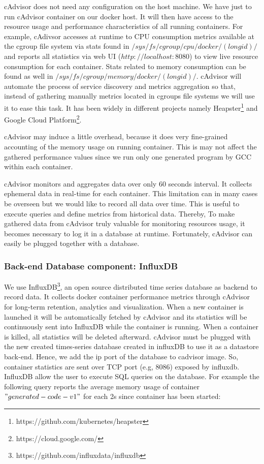 cAdvisor does not need any configuration on the host machine. We have just to run cAdvisor container on our docker host. It will then have access to the resource usage and performance characteristics of all running containers. For example, cAdivsor accesses at runtime to CPU consumption metrics available at the cgroup file system via stats found in $/sys/fs/cgroup/cpu/docker/(longid)/$ and reports all statistics via web UI ($http://localhost:8080$) to view live resource consumption for each container. Stats related to memory consumption can be found as well in $/sys/fs/cgroup/memory/docker/(longid)/$. cAdvisor will automate the process of service discovery and metrics aggregation so that, instead of gathering manually metrics located in cgroups file systems we will use it to ease this task. It has been widely in different projects namely Heapster\footnote{https://github.com/kubernetes/heapster} and Google Cloud Platform\footnote{https://cloud.google.com/}.

cAdvisor may induce a little overhead, because it does very fine-grained accounting of the memory usage on running container. This is may not affect the gathered performance values since we run only one generated program by GCC within each container.

cAdvisor monitors and aggregates data over only 60 seconds interval. It collects ephemeral data in real-time for each container. This limitation can in many cases be overseen but we would like to record all data over time. This is useful to execute queries and define metrics from historical data. Thereby, To make gathered data from cAdvisor truly valuable for monitoring resources usage, it becomes necessary to log it in a database at runtime. Fortunately, cAdvisor can easily be plugged together with a database.
\subsubsection{Back-end Database component: InfluxDB}
We use InfluxDB\footnote{https://github.com/influxdata/influxdb}, an open source distributed time series database as backend to record data. It collects docker container performance metrics through cAdvisor for long-term retention, analytics and visualization. When a new container is launched it will be automatically fetched by cAdvisor and its statistics will be continuously sent into InfluxDB while the container is running. When a container is killed, all statistics will be deleted afterward. cAdvisor must be plugged with the new created
times-series database created in influxDB to use it as a datastore back-end. Hence, we add the ip port of the database to cadvisor image. So, container statistics are sent over TCP port (e.g, 8086) exposed by influxdb.
InfluxDB allow the user to execute SQL queries on the database. For example the following query reports the average memory usage of container $"generated-code-v1"$ for each 2s since container has been started:

